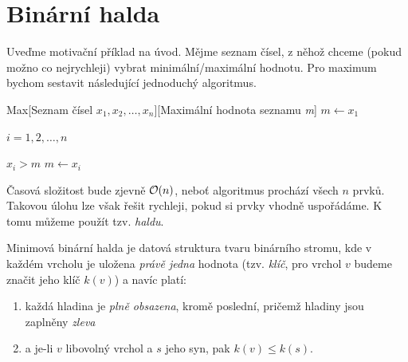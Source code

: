 \section{Binární halda}\label{sec:halda}
Uveďme motivační příklad na úvod. Mějme seznam čísel, z něhož chceme (pokud možno co nejrychleji) vybrat minimální/maximální hodnotu. Pro maximum bychom sestavit následující jednoduchý algoritmus.
\begin{pseudo}{Max}[Seznam čísel $x_1,x_2,\dots,x_n$][Maximální hodnota seznamu \textit{m}]
    $m\gets x_1$\\
    \begin{For}{$i=1,2,\dots,n$}
        \begin{If}{$x_i>m$}
            $m\gets x_i$
        \end{If}
    \end{For}
\end{pseudo}

Časová složitost bude zjevně $\mathcal{O}(n)$, neboť algoritmus prochází všech $n$ prvků. Takovou úlohu lze však řešit rychleji, pokud si prvky vhodně uspořádáme. K tomu můžeme použít tzv. \emph{haldu}. 
\begin{definition}\label{def:binarni_halda}
    Minimová binární halda je datová struktura tvaru binárního stromu, kde v každém vrcholu je uložena \emph{právě jedna} hodnota (tzv. \emph{klíč}, pro vrchol $v$ budeme značit jeho klíč $k(v)$) a navíc platí:
    \begin{enumerate}[label=(\roman*)]
        \item\label{binhalda_podminka_1} každá hladina je \emph{plně obsazena}, kromě poslední, pričemž hladiny jsou zaplněny \emph{zleva}
        \item\label{binhalda_podminka_2} a je-li $v$ libovolný vrchol a $s$ jeho syn, pak $k(v)\leqslant k(s)$.
    \end{enumerate}
\end{definition}

